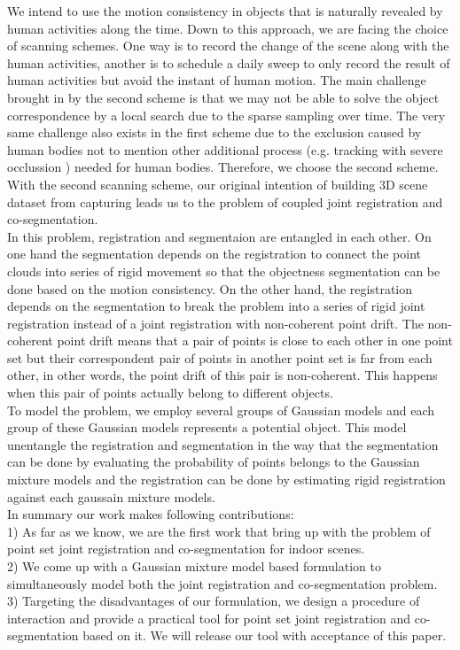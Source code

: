 We intend to use the motion consistency in objects that is naturally revealed by human activities along the time. Down to this approach, we are facing the choice of scanning schemes. One way is to record the change of the scene along with the human activities, another is to  schedule a daily sweep to only record the result of human activities but avoid the instant of human motion. The main challenge brought in by the second scheme is that we may not be able to solve the object correspondence by a local search due to the sparse sampling over time. The very same challenge also exists in the first scheme due to the exclusion caused by human bodies not to mention other additional process (e.g. tracking with severe occlussion ) needed for human bodies. Therefore, we choose the second scheme. With the second scanning scheme, our original intention of building 3D scene dataset from capturing leads us to the problem of coupled joint registration and co-segmentation.\\ 
In this problem, registration and segmentaion are entangled in each other. On one hand the segmentation depends on the registration to connect the point clouds into series of rigid movement so that the objectness segmentation can be done based on the motion consistency. On the other hand, the registration depends on the segmentation to break the problem into a series of rigid joint registration instead of a joint registration with non-coherent point drift. The non-coherent point drift means that a pair of points is close to each other in one point set but their correspondent pair of points in another point set is far from each other, in other words, the point drift of this pair is non-coherent. This happens when this pair of points actually belong to different objects.\\
To model the problem, we employ several groups of Gaussian models and each group of these Gaussian models represents a potential object. This model unentangle the registration and segmentation in the way that the segmentation can be done by evaluating the probability of points belongs to the Gaussian mixture models and the registration can be done by estimating rigid registration against each gaussain mixture models.\\
In summary our work makes following contributions: \\
%
%
1) As far as we know, we are the first work that bring up with the problem of point set joint registration and co-segmentation for indoor scenes.\\
2) We come up with a Gaussian mixture model based formulation to simultaneously model both the joint registration and co-segmentation problem.\\
3) Targeting the disadvantages of our formulation, we design a procedure of interaction and provide a practical tool for point set joint registration and co-segmentation based on it. We will release our tool with acceptance of this paper.
